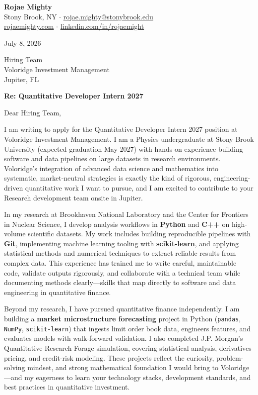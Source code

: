 \documentclass[11pt,letterpaper]{article}
\begin{document}
\textbf{Rojae Mighty}\\
Stony Brook, NY \quad$\cdot$\quad
\href{mailto:rojae.mighty@stonybrook.edu}{rojae.mighty@stonybrook.edu}\\
\href{https://rojaemighty.com}{rojaemighty.com} \quad$\cdot$\quad
\href{https://www.linkedin.com/in/rojaemight/}{linkedin.com/in/rojaemight}

\vspace{12pt}
July 8, 2026

\vspace{12pt}
Hiring Team\\
Voloridge Investment Management\\
Jupiter, FL

\vspace{12pt}
\textbf{Re: Quantitative Developer Intern 2027}

\vspace{6pt}
Dear Hiring Team,

I am writing to apply for the Quantitative Developer Intern 2027 position at Voloridge Investment Management. I am a Physics undergraduate at Stony Brook University (expected graduation May 2027) with hands-on experience building software and data pipelines on large datasets in research environments. Voloridge's integration of advanced data science and mathematics into systematic, market-neutral strategies is exactly the kind of rigorous, engineering-driven quantitative work I want to pursue, and I am excited to contribute to your Research development team onsite in Jupiter.

In my research at Brookhaven National Laboratory and the Center for Frontiers in Nuclear Science, I develop analysis workflows in \textbf{Python} and \textbf{C++} on high-volume scientific datasets. My work includes building reproducible pipelines with \textbf{Git}, implementing machine learning tooling with \textbf{scikit-learn}, and applying statistical methods and numerical techniques to extract reliable results from complex data. This experience has trained me to write careful, maintainable code, validate outputs rigorously, and collaborate with a technical team while documenting methods clearly---skills that map directly to software and data engineering in quantitative finance.

Beyond my research, I have pursued quantitative finance independently. I am building a \textbf{market microstructure forecasting} project in Python (\texttt{pandas}, \texttt{NumPy}, \texttt{scikit-learn}) that ingests limit order book data, engineers features, and evaluates models with walk-forward validation. I also completed J.P. Morgan's Quantitative Research Forage simulation, covering statistical analysis, derivatives pricing, and credit-risk modeling. These projects reflect the curiosity, problem-solving mindset, and strong mathematical foundation I would bring to Voloridge---and my eagerness to learn your technology stacks, development standards, and best practices in quantitative investment.
\end{document}
